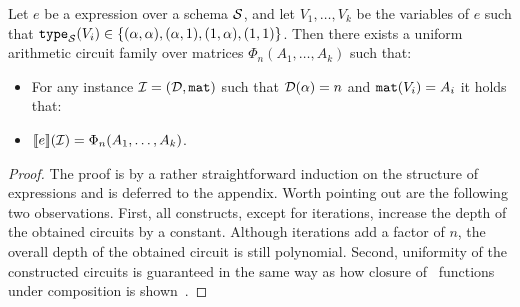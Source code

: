 \begin{theorem}
\label{th-ml-to-circuits}
Let $e$ be a \langfor expression over a schema $\mathcal{S}$, and let $V_1,\ldots ,V_k$ be the variables of $e$ such that $\texttt{type}_{\mathcal{S}}(V_i)\in \{(\alpha,\alpha), (\alpha,1), (1,\alpha), (1,1)\}$. Then there exists a uniform arithmetic circuit family over matrices $\Phi_n(A_1,\ldots ,A_k)$ such that:
\begin{itemize}
\item For any instance $\mathcal{I} = (\mathcal{D},\texttt{mat})$ such that $\mathcal{D}(\alpha) = n$ and $\texttt{mat}(V_i) = A_i$ it holds that:
\item $\llbracket e \rrbracket(\mathcal{I}) = \Phi_n(A_1,\ldots ,A_k)$.
\end{itemize}
\end{theorem}
\begin{proof}
The proof is by a rather straightforward induction on the structure of \langfor expressions and is deferred to the appendix. Worth pointing out are the following two observations. First, all \langfor constructs, except for iterations, increase the depth of the obtained circuits by a constant. Although iterations add a factor of $n$, the overall depth of the obtained circuit is still polynomial. Second, uniformity of the constructed circuits is guaranteed in the same way as how closure of 
\logspace\ functions under composition is shown~\cite{aroraB2009}.
\end{proof}


